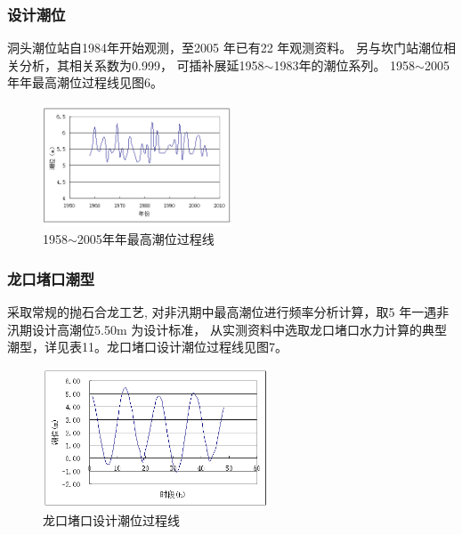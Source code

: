 \documentclass[UTF8, a4paper, 12pt]{ctexart} %
\begin{document}
\subsubsection{设计潮位}
洞头潮位站自1984年开始观测，至2005 年已有22 年观测资料。
另与坎门站潮位相关分析，其相关系数为0.999，
可插补展延1958$\sim$1983年的潮位系列。
1958$\sim$2005年年最高潮位过程线见图6。







\begin{figure}[h]
    \centering
    \includegraphics[width=0.5\textwidth]{7.png}
    \caption{1958$\sim$2005年年最高潮位过程线}
    \label{fig:annual_highest_tide_level}
\end{figure}
\subsubsection{龙口堵口潮型 }
采取常规的抛石合龙工艺, 对非汛期中最高潮位进行频率分析计算，取5 年一遇非汛期设计高潮位5.50m 为设计标准，
从实测资料中选取龙口堵口水力计算的典型潮型，详见表11。龙口堵口设计潮位过程线见图7。
\begin{figure}[h]
    \centering
    \includegraphics[width=0.6\textwidth]{8.png}
    \caption{龙口堵口设计潮位过程线}
    \label{fig:dragon_port_tide_level}
    
\end{figure}
\end{document}

